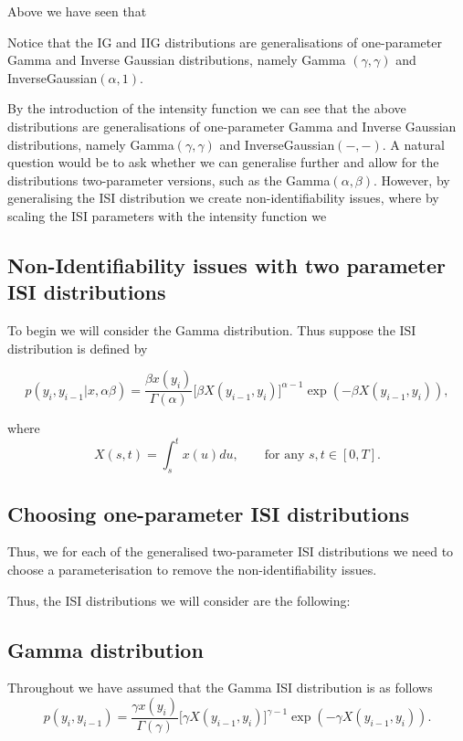 \documentclass[../main.tex]{subfiles}
\begin{document}

Above we have seen that 

    
Notice that the IG and IIG distributions are generalisations of one-parameter Gamma and Inverse Gaussian distributions, namely Gamma $(\gamma, \gamma)$ and InverseGaussian$(\alpha,1)$.

By the introduction of the intensity function we can see that the above distributions are generalisations of one-parameter Gamma and Inverse Gaussian distributions, namely Gamma$(\gamma, \gamma)$ and InverseGaussian$(-,-)$. A natural question would be to ask whether we can generalise further and allow for the distributions two-parameter versions, such as the Gamma$(\alpha, \beta)$. However, by generalising the ISI distribution we create non-identifiability issues, where by scaling the ISI parameters with the intensity function we 
 
\subsection{Non-Identifiability issues with two parameter ISI distributions} 
To begin we will consider the Gamma distribution. Thus suppose the ISI distribution is defined by

\begin{equation}
 p(y_i, y_{i-1}| x, \alpha \beta) =  \frac{\beta x(y_i)}{\Gamma ( \alpha )} \big[ \beta X(y_{i-1} , y_i ) \big]^{\alpha -1} \exp( - \beta X(y_{i-1} , y_i )  ),
 \end{equation}
 
 where 
  \begin{equation}
X(s,t) = \int^{t}_{s} x(u) du , \qquad \text{for any } s,t \in [0,T].
\end{equation}


 
\subsection{Choosing one-parameter ISI distributions}
Thus, we for each of the generalised two-parameter ISI distributions we need to choose a parameterisation to remove the non-identifiability issues. 

Thus, the ISI distributions we will consider are the following:

\subsection{Gamma distribution}
Throughout we have assumed that the Gamma ISI distribution is as follows 
\begin{equation}
 p(y_i, y_{i-1}) =  \frac{\gamma x(y_i)}{\Gamma ( \gamma )} \big[ \gamma X(y_{i-1} , y_i ) \big]^{\gamma -1} \exp( - \gamma X(y_{i-1} , y_i )  ).
 \end{equation}
 
\end{document}
